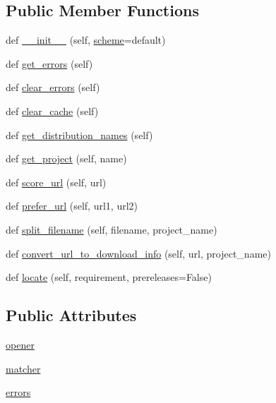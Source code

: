 \subsection*{Public Member Functions}
\begin{DoxyCompactItemize}
\item 
def \hyperlink{classpip_1_1__vendor_1_1distlib_1_1locators_1_1Locator_af37665238a4ad058e6b2e4d6b77d0ffc}{\+\_\+\+\_\+init\+\_\+\+\_\+} (self, \hyperlink{classpip_1_1__vendor_1_1distlib_1_1locators_1_1Locator_a3bb93cf50791a8f9a65238b3cd464fc3}{scheme}=\textquotesingle{}default\textquotesingle{})
\item 
def \hyperlink{classpip_1_1__vendor_1_1distlib_1_1locators_1_1Locator_a001dcda572c307fbc81dc17c1056df8a}{get\+\_\+errors} (self)
\item 
def \hyperlink{classpip_1_1__vendor_1_1distlib_1_1locators_1_1Locator_a3d419a5885dcd829fd06b8230c8495e8}{clear\+\_\+errors} (self)
\item 
def \hyperlink{classpip_1_1__vendor_1_1distlib_1_1locators_1_1Locator_aa8e1b24125b3cecddfa873c5ded5f3bb}{clear\+\_\+cache} (self)
\item 
def \hyperlink{classpip_1_1__vendor_1_1distlib_1_1locators_1_1Locator_a6942e1ef6deacef66d49eafe3e38b6d6}{get\+\_\+distribution\+\_\+names} (self)
\item 
def \hyperlink{classpip_1_1__vendor_1_1distlib_1_1locators_1_1Locator_a48d9eb4bd10059daaafb980acd1ece2a}{get\+\_\+project} (self, name)
\item 
def \hyperlink{classpip_1_1__vendor_1_1distlib_1_1locators_1_1Locator_a3180e78cd0ef4792f1ddcde7866695f9}{score\+\_\+url} (self, url)
\item 
def \hyperlink{classpip_1_1__vendor_1_1distlib_1_1locators_1_1Locator_ae6ca5b000e41016c8ddd878969b15b1e}{prefer\+\_\+url} (self, url1, url2)
\item 
def \hyperlink{classpip_1_1__vendor_1_1distlib_1_1locators_1_1Locator_a8e68b5106f89d22f24a6cb8652099172}{split\+\_\+filename} (self, filename, project\+\_\+name)
\item 
def \hyperlink{classpip_1_1__vendor_1_1distlib_1_1locators_1_1Locator_a3bbabc70c96690aa99a8cbb0bf4c1d7f}{convert\+\_\+url\+\_\+to\+\_\+download\+\_\+info} (self, url, project\+\_\+name)
\item 
def \hyperlink{classpip_1_1__vendor_1_1distlib_1_1locators_1_1Locator_a52564972db53ebf3ebfc4ec6bf2020e3}{locate} (self, requirement, prereleases=False)
\end{DoxyCompactItemize}
\subsection*{Public Attributes}
\begin{DoxyCompactItemize}
\item 
\hyperlink{classpip_1_1__vendor_1_1distlib_1_1locators_1_1Locator_a681e7198f02453e084b85524fd9da02b}{opener}
\item 
\hyperlink{classpip_1_1__vendor_1_1distlib_1_1locators_1_1Locator_ab5b8c18b78b59378d15a48a66356e217}{matcher}
\item 
\hyperlink{classpip_1_1__vendor_1_1distlib_1_1locators_1_1Locator_a31798f233578bd6a7ffbc1fb310f34ae}{errors}
\end{DoxyCompactItemize}
